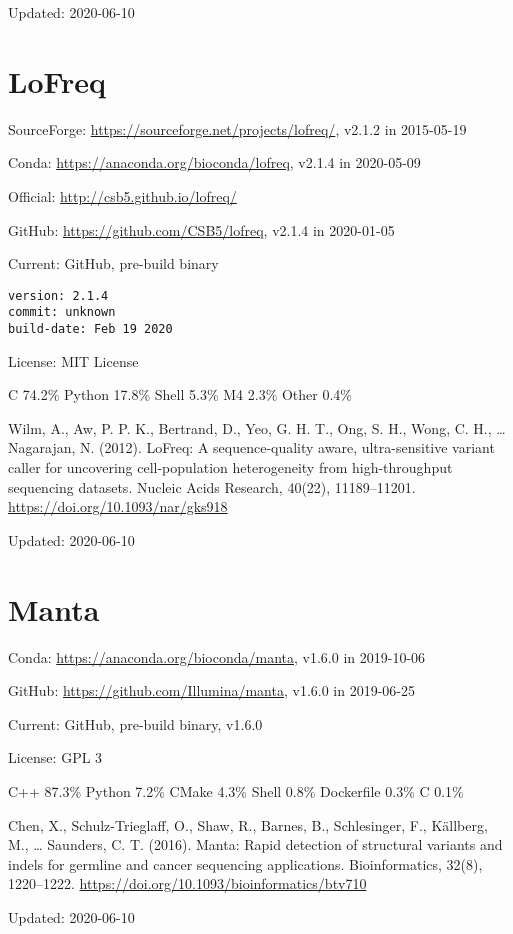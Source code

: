 \documentclass[]{article}
\begin{document}
Updated: 2020-06-10


\section{LoFreq}

SourceForge: \url{https://sourceforge.net/projects/lofreq/}, v2.1.2 in 2015-05-19

Conda: \url{https://anaconda.org/bioconda/lofreq}, v2.1.4 in 2020-05-09

Official: \url{http://csb5.github.io/lofreq/}

GitHub: \url{https://github.com/CSB5/lofreq}, v2.1.4 in 2020-01-05

Current: GitHub, pre-build binary

\begin{verbatim}
version: 2.1.4
commit: unknown
build-date: Feb 19 2020
\end{verbatim}

License: MIT License

C 74.2\% Python 17.8\% Shell 5.3\% M4 2.3\% Other 0.4\%

Wilm, A., Aw, P. P. K., Bertrand, D., Yeo, G. H. T., Ong, S. H., Wong, C. H., … Nagarajan, N. (2012). LoFreq: A sequence-quality aware, ultra-sensitive variant caller for uncovering cell-population heterogeneity from high-throughput sequencing datasets. Nucleic Acids Research, 40(22), 11189–11201. \url{https://doi.org/10.1093/nar/gks918}

Updated: 2020-06-10
\section{Manta}

Conda: \url{https://anaconda.org/bioconda/manta}, v1.6.0 in 2019-10-06

GitHub: \url{https://github.com/Illumina/manta}, v1.6.0 in 2019-06-25

Current: GitHub, pre-build binary, v1.6.0

License: GPL 3

C++ 87.3\% Python 7.2\% CMake 4.3\% Shell 0.8\% Dockerfile 0.3\% C 0.1\%

Chen, X., Schulz-Trieglaff, O., Shaw, R., Barnes, B., Schlesinger, F., Källberg, M., … Saunders, C. T. (2016). Manta: Rapid detection of structural variants and indels for germline and cancer sequencing applications. Bioinformatics, 32(8), 1220–1222. \url{https://doi.org/10.1093/bioinformatics/btv710}

Updated: 2020-06-10
\end{document}
